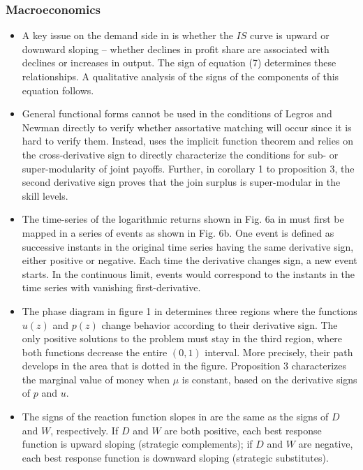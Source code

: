 \documentclass[11pt]{book}
\begin{document}
\subsubsection{Macroeconomics}
\begin{itemize}
\item A key issue on the demand side in \cite{braunstein2011embedding}
is whether the $IS$ curve is upward or downward sloping -- whether
declines in profit share are associated with declines or increases
in output. The sign of equation (7) determines these relationships.
A qualitative analysis of the signs of the components of this equation
follows.
\item General functional forms cannot be used in the conditions of Legros
and Newman directly to verify whether assortative matching will occur
since it is hard to verify them. Instead, \cite{ghatak2011contractual}
uses the implicit function theorem and relies on the cross-derivative
sign to directly characterize the conditions for sub- or super-modularity
of joint payoffs. Further, in corollary 1 to proposition 3, the second
derivative sign proves that the join surplus is super-modular in the
skill levels.
\item The time-series of the logarithmic returns shown in Fig. 6a in \cite{da2012heavy}
must first be mapped in a series of events as shown in Fig. 6b. One
event is defined as successive instants in the original time series
having the same derivative sign, either positive or negative. Each
time the derivative changes sign, a new event starts. In the continuous
limit, events would correspond to the instants in the time series
with vanishing first-derivative.
\item The phase diagram in figure 1 in \cite{lippi2014state}
determines three regions where the functions $u\left(z\right)$ and
$p\left(z\right)$ change behavior according to their derivative sign.
The only positive solutions to the problem must stay in the third
region, where both functions decrease the entire $\left(0,1\right)$
interval. More precisely, their path develops in the area that is
dotted in the figure. Proposition 3 characterizes the marginal value
of money when $\mu$ is constant, based on the derivative signs of
$p$ and $u$.
\item The signs of the reaction function slopes in \cite{baker2016exclusionary}
are the same as the signs of $D$ and $W$, respectively. If $D$
and $W$ are both positive, each best response function is upward
sloping (strategic complements); if $D$ and $W$ are negative, each
best response function is downward sloping (strategic substitutes).

\end{itemize}
\end{document}
